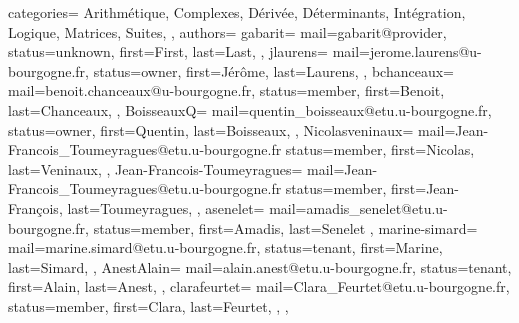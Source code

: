 {
  categories={%
    Arithmétique,
    Complexes,
    Dérivée,
    Déterminants,
    Intégration,
    Logique,
    Matrices,
    Suites,
  },
  authors={
    gabarit={%
      mail=gabarit@provider,
      status=unknown,
      first=First,
      last=Last,
    },
    jlaurens={%
      mail=jerome.laurens@u-bourgogne.fr,
      status=owner,
      first=Jérôme,
      last=Laurens,
    },
    bchanceaux={
      mail=benoit.chanceaux@u-bourgogne.fr,
      status=member,
      first=Benoit,
      last=Chanceaux,
    },
    BoisseauxQ={
      mail=quentin_boisseaux@etu.u-bourgogne.fr,
      status=owner,
      first=Quentin,
      last=Boisseaux,
    },
    Nicolasveninaux={
      mail=Jean-Francois_Toumeyragues@etu.u-bourgogne.fr
      status=member,
      first=Nicolas,
      last=Veninaux,
    },
    Jean-Francois-Toumeyragues={
      mail=Jean-Francois_Toumeyragues@etu.u-bourgogne.fr
      status=member,
      first=Jean-François,
      last=Toumeyragues,
    },
    asenelet={
      mail=amadis_senelet@etu.u-bourgogne.fr, 
      status=member,
      first=Amadis,
      last=Senelet
    },
    marine-simard={
      mail=marine.simard@etu.u-bourgogne.fr,
      status=tenant,
      first=Marine,
      last=Simard,
    },  
    AnestAlain={
      mail=alain.anest@etu.u-bourgogne.fr,
      status=tenant,
      first=Alain,
      last=Anest,
    },
    clarafeurtet={
       mail=Clara_Feurtet@etu.u-bourgogne.fr,
       status=member,
       first=Clara,
       last=Feurtet,
     },
  },
}
